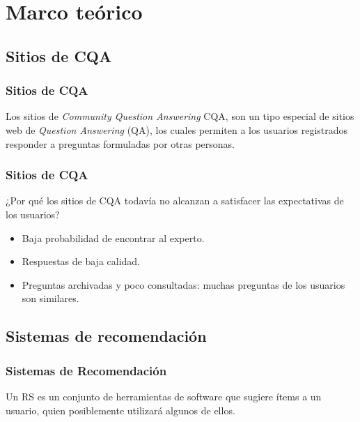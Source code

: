 \section{Marco teórico}
\subsection{Sitios de CQA}
\begin{frame}
	\frametitle{Sitios de CQA}
	\begin{tcolorbox}[colback=blue!5,colframe=blue!40!black,title=Sitios de Community Question Answering]
		Los sitios de \textit{Community Question Answering} CQA, son un tipo especial de sitios web de \textit{Question Answering} (QA), los cuales permiten a los usuarios registrados responder a preguntas formuladas por otras personas.
	\end{tcolorbox}
\end{frame}

\begin{frame}
	\frametitle{Sitios de CQA}
	¿Por qué los sitios de CQA todavía no alcanzan a satisfacer las expectativas de los usuarios?
	\bigskip
	\begin{itemize} [<+>]
		\item Baja probabilidad de encontrar al experto.
		\item Respuestas de baja calidad.
		\item Preguntas archivadas y poco consultadas: muchas preguntas de los usuarios son similares.
	\end{itemize}
\end{frame}

\subsection{Sistemas de recomendación}
\begin{frame}
	\frametitle{Sistemas de Recomendación}
	\begin{tcolorbox}[colback=blue!5,colframe=blue!40!black,title=Sistemas de Recomendación]
		Un RS es un conjunto de herramientas de software que sugiere ítems a un usuario, quien posiblemente utilizará algunos de ellos.
	\end{tcolorbox}
\end{frame}

